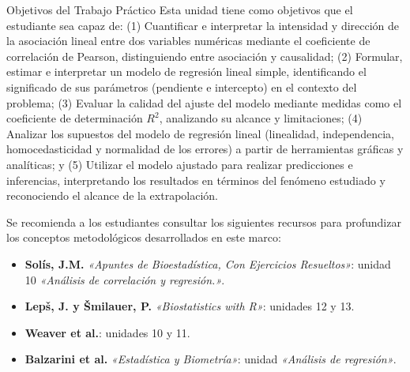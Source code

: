 \documentclass[
  spanish,
  letterpaper,
  DIV=11,
  numbers=noendperiod]{scrreprt}
\providecommand{\tightlist}{%
  \setlength{\itemsep}{0pt}\setlength{\parskip}{0pt}}
\begin{document}
Objetivos del Trabajo Práctico Esta unidad tiene como objetivos que el
estudiante sea capaz de: (1) Cuantificar e interpretar la intensidad y
dirección de la asociación lineal entre dos variables numéricas mediante
el coeficiente de correlación de Pearson, distinguiendo entre asociación
y causalidad; (2) Formular, estimar e interpretar un modelo de regresión
lineal simple, identificando el significado de sus parámetros (pendiente
e intercepto) en el contexto del problema; (3) Evaluar la calidad del
ajuste del modelo mediante medidas como el coeficiente de determinación
\(R^2\), analizando su alcance y limitaciones; (4) Analizar los
supuestos del modelo de regresión lineal (linealidad, independencia,
homocedasticidad y normalidad de los errores) a partir de herramientas
gráficas y analíticas; y (5) Utilizar el modelo ajustado para realizar
predicciones e inferencias, interpretando los resultados en términos del
fenómeno estudiado y reconociendo el alcance de la extrapolación.

\begin{tcolorbox}[enhanced jigsaw, arc=.35mm, bottomrule=.15mm, bottomtitle=1mm, breakable, colback=white, colbacktitle=quarto-callout-important-color!10!white, colframe=quarto-callout-important-color-frame, coltitle=black, left=2mm, leftrule=.75mm, opacityback=0, opacitybacktitle=0.6, rightrule=.15mm, title=\textcolor{quarto-callout-important-color}{\faExclamation}\hspace{0.5em}{Lectura Sugerida para el Trabajo Práctico}, titlerule=0mm, toprule=.15mm, toptitle=1mm]

Se recomienda a los estudiantes consultar los siguientes recursos para
profundizar los conceptos metodológicos desarrollados en este marco:

\begin{itemize}
\tightlist
\item
  \textbf{Solís, J.M.} \emph{«Apuntes de Bioestadística, Con Ejercicios
  Resueltos»}: unidad 10 \emph{«Análisis de correlación y regresión.»}.
\item
  \textbf{Lepš, J. y Šmilauer, P.} \emph{«Biostatistics with R»}:
  unidades 12 y 13.
\item
  \textbf{Weaver et al.}: unidades 10 y 11.
\item
  \textbf{Balzarini et al.} \emph{«Estadística y Biometría»}: unidad
  \emph{«Análisis de regresión»}.
\end{itemize}

\end{tcolorbox}
\end{document}
